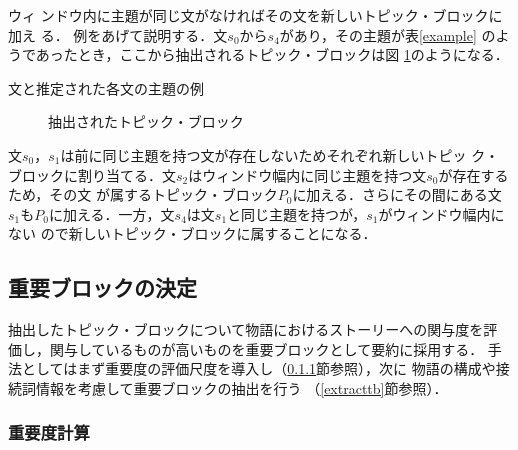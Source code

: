 \documentclass[japanese]{jnlp_1.4}
\begin{document}
  ウィ
  ンドウ内に主題が同じ文がなければその文を新しいトピック・ブロックに加え
  る．
  例をあげて説明する．文$s_0$から$s_4$があり，その主題が表\ref{example}
  のようであったとき，ここから抽出されるトピック・ブロックは図
  \ref{tbexample}のようになる．

   \begin{table}[b]
    \caption{文と推定された各文の主題の例}
    \label{example}
   \begin{center}

   \end{center}
  \end{table}

  \begin{figure}[t]

\caption{抽出されたトピック・ブロック}
\label{tbexample}
  \end{figure}

  文$s_0$，$s_1$は前に同じ主題を持つ文が存在しないためそれぞれ新しいトピッ
  ク・ブロックに割り当てる．文$s_2$はウィンドウ幅内に同じ主題を持つ文$s_0$が存在するため，その文
  が属するトピック・ブロック$P_0$に加える．さらにその間にある文$s_1$も$P_0$に加える．一方，文$s_4$は文$s_1$と同じ主題を持つが，$s_1$がウィンドウ幅内にない
  ので新しいトピック・ブロックに属することになる．


  \subsection{重要ブロックの決定}\label{select}

  抽出したトピック・ブロックについて物語におけるストーリーへの関与度を評
  価し，関与しているものが高いものを重要ブロックとして要約に採用する．
  手法としてはまず重要度の評価尺度を導入し（\ref{importance}節参照），次に
  物語の構成や接続詞情報を考慮して重要ブロックの抽出を行う
 （\ref{extracttb}節参照）．


  \subsubsection{重要度計算}\label{importance}
\end{document}
